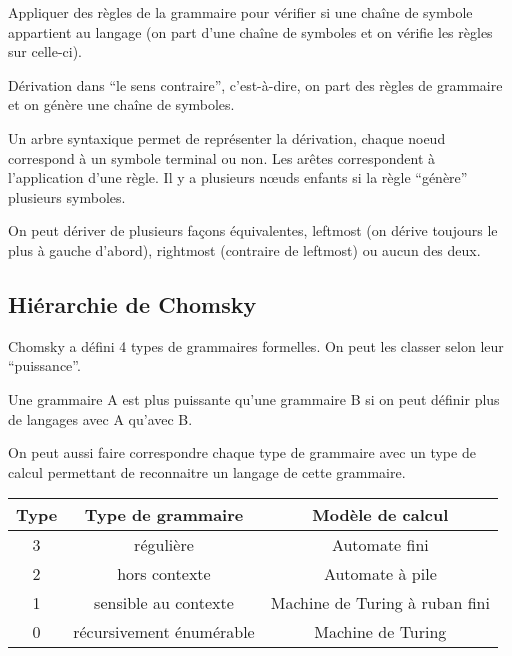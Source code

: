 \begin{mydef}[Dériver] Appliquer des règles de la grammaire pour vérifier
	si une chaîne de symbole appartient au langage (on part d'une chaîne de symboles
	et on vérifie les règles sur celle-ci).
\end{mydef}

\begin{mydef}[Inférer] Dérivation dans ``le sens contraire'',
	c'est-à-dire, on part des règles de grammaire et on génère une chaîne
	de symboles.
\end{mydef}

\begin{mydef}
	Un arbre syntaxique permet de représenter la dérivation, chaque noeud
	correspond à un symbole terminal ou non. Les arêtes correspondent à
	l'application d'une règle. Il y a plusieurs nœuds enfants si la règle
	``génère'' plusieurs symboles.
\end{mydef}

\begin{myprop}
	On peut dériver de plusieurs façons équivalentes, leftmost (on dérive
	toujours le plus à gauche d'abord), rightmost (contraire de leftmost)
	ou  aucun des deux.
\end{myprop}

\subsection{Hiérarchie de Chomsky}
\label{ssub:hi_rarchie_de_chomsky}

Chomsky a défini 4 types de grammaires formelles. On peut les classer selon
leur ``puissance''.

\begin{mydef}
	Une grammaire A est plus puissante qu'une grammaire B si on peut définir plus
	de langages avec A qu'avec B.
\end{mydef}

On peut aussi faire correspondre chaque type de grammaire avec un type de
calcul permettant de reconnaitre un langage de cette grammaire.

\begin{tabular}{|c|c|c|}
	\hline
	 Type & Type de grammaire & Modèle de calcul\\
	 \hline
	3 & régulière & Automate fini \\
	 \hline
	2 & hors contexte & Automate à pile \\
	 \hline
	1 & sensible au contexte & Machine de Turing à ruban fini \\
	 \hline
	0 & récursivement énumérable & Machine de Turing \\
	\hline
\end{tabular}

